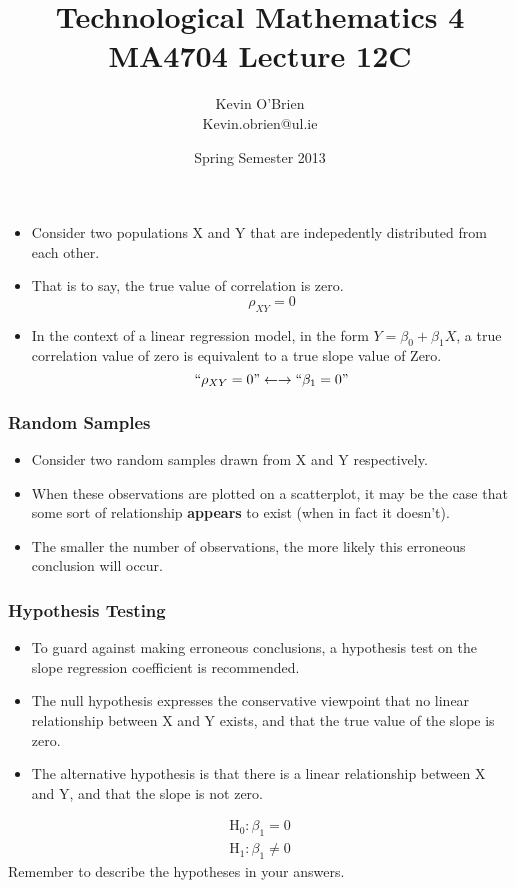 \documentclass[a4]{beamer}
\title[MA4704]{Technological Mathematics 4 \\ {\normalsize MA4704 Lecture 12C}}
\author[Kevin O'Brien]{Kevin O'Brien \\ {\scriptsize Kevin.obrien@ul.ie}}
\date{Spring Semester 2013}
\institute[Maths \& Stats]{Dept. of Mathematics \& Statistics, \\ University \textit{of} Limerick}
\begin{document}
\begin{frame}
\titlepage
\end{frame}

\begin{frame}
\begin{itemize}
\item Consider two populations X and Y that are indepedently distributed from
each other.
\item That is to say, the true value of correlation is zero.
\[\rho_{XY} = 0 \]
\item In the context of a linear regression model, in the form $Y=\beta_0  +  \beta_1X$, a true correlation value of zero is equivalent to a true slope value of Zero.
\[``\rho_{XY} = 0" \leftarrow\rightarrow ``\beta_1=0"\]
\end{itemize}
\end{frame}
\begin{frame}
\frametitle{Random Samples}
\begin{itemize}
\item Consider two random samples drawn from X and Y respectively.
\item When these observations are plotted on a scatterplot, it
may be the case that some sort of relationship \textbf{appears} to exist (when in fact it doesn't).
\item The smaller the number of observations, the more likely this erroneous conclusion will occur.
\end{itemize}
\end{frame}
\begin{frame}
\frametitle{Hypothesis Testing}
\begin{itemize}
\item To guard against making erroneous conclusions, a hypothesis test on the slope regression coefficient is
recommended.
\item The null hypothesis expresses the conservative viewpoint that no linear relationship between X and Y exists, and that the true value of the slope is zero.
\item The alternative hypothesis is that there is a linear relationship between X and Y, and that the slope is not zero.
\end{itemize}
\begin{eqnarray}
\mbox{H}_{0} : \beta_1 = 0 \\
\mbox{H}_{1} : \beta_1 \neq 0 
\end{eqnarray}
Remember to describe the hypotheses in your answers.
\end{frame}
\end{document}
